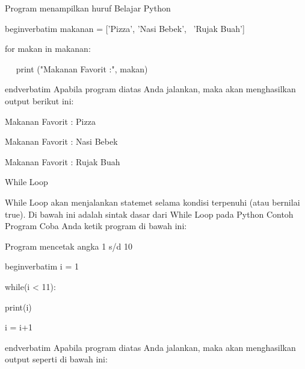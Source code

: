  \par
Program menampilkan huruf Belajar Python \par
\vspace{12pt}
begin{verbatim}
makanan = ['Pizza', 'Nasi Bebek',~ 'Rujak Buah'] \par
for makan in makanan: \par
~~ print ("Makanan Favorit :", makan) \par
end{verbatim}
\vspace{12pt}
Apabila program diatas Anda jalankan, maka akan menghasilkan output berikut ini:\vspace{\baselineskip}
\vspace{\baselineskip}
 \par
Makanan Favorit : Pizza \par
Makanan Favorit : Nasi Bebek \par
Makanan Favorit : Rujak Buah \par
\vspace{12pt}
\vspace{\baselineskip}
\vspace{12pt}
While Loop \par
While Loop akan menjalankan statemet selama kondisi terpenuhi (atau bernilai true).\vspace{\baselineskip}
\vspace{\baselineskip}
Di bawah ini adalah sintak dasar dari While Loop pada Python\vspace{\baselineskip}
\vspace{\baselineskip}
Contoh Program\vspace{\baselineskip}
\vspace{\baselineskip}
Coba Anda ketik program di bawah ini:\vspace{\baselineskip}
\vspace{\baselineskip}
 \par
Program mencetak angka 1 s/d 10 \par
\vspace{12pt}
begin{verbatim}
i = 1 \par
while(i < 11): \par
 print(i) \par
 i = i+1 \par
 end{verbatim}
\vspace{\baselineskip}
Apabila program diatas Anda jalankan, maka akan menghasilkan output seperti di bawah ini:\vspace{\baselineskip}
\vspace{\baselineskip}
